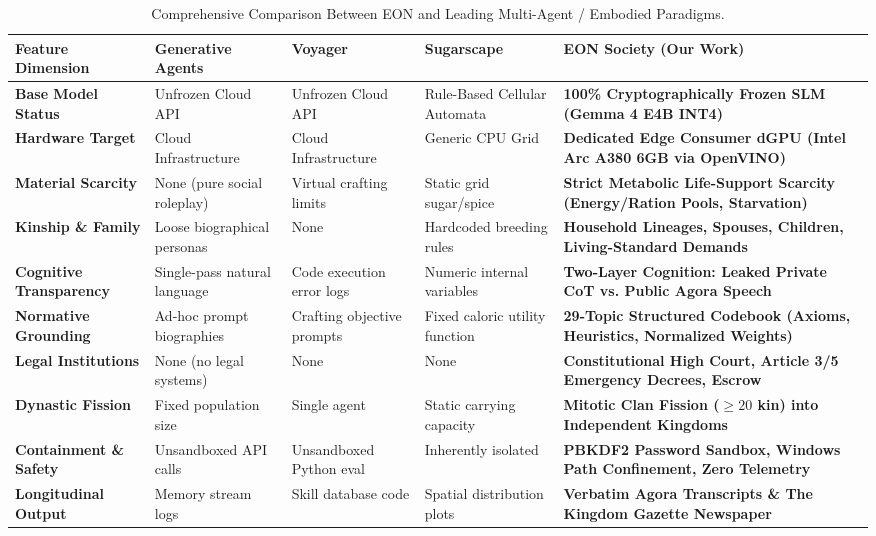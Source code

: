 \documentclass[11pt,a4paper]{article}
\begin{document}
\begin{table}[t]
\centering
\small
\caption{Comprehensive Comparison Between EON and Leading Multi-Agent / Embodied Paradigms.}
\label{tab:comparison}
\begin{tabularx}{\textwidth}{lXXXX}
\toprule
\textbf{Feature Dimension} & \textbf{Generative Agents \cite{park2023generative}} & \textbf{Voyager \cite{wang2023voyager}} & \textbf{Sugarscape \cite{epstein1996growing}} & \textbf{EON Society (Our Work)} \\
\midrule
\textbf{Base Model Status} & Unfrozen Cloud API & Unfrozen Cloud API & Rule-Based Cellular Automata & \textbf{100\% Cryptographically Frozen SLM (Gemma 4 E4B INT4)} \\
\addlinespace
\textbf{Hardware Target} & Cloud Infrastructure & Cloud Infrastructure & Generic CPU Grid & \textbf{Dedicated Edge Consumer dGPU (Intel Arc A380 6GB via OpenVINO)} \\
\addlinespace
\textbf{Material Scarcity} & None (pure social roleplay) & Virtual crafting limits & Static grid sugar/spice & \textbf{Strict Metabolic Life-Support Scarcity (Energy/Ration Pools, Starvation)} \\
\addlinespace
\textbf{Kinship \& Family} & Loose biographical personas & None & Hardcoded breeding rules & \textbf{Household Lineages, Spouses, Children, Living-Standard Demands} \\
\addlinespace
\textbf{Cognitive Transparency} & Single-pass natural language & Code execution error logs & Numeric internal variables & \textbf{Two-Layer Cognition: Leaked Private CoT vs. Public Agora Speech} \\
\addlinespace
\textbf{Normative Grounding} & Ad-hoc prompt biographies & Crafting objective prompts & Fixed caloric utility function & \textbf{29-Topic Structured Codebook (Axioms, Heuristics, Normalized Weights)} \\
\addlinespace
\textbf{Legal Institutions} & None (no legal systems) & None & None & \textbf{Constitutional High Court, Article 3/5 Emergency Decrees, Escrow} \\
\addlinespace
\textbf{Dynastic Fission} & Fixed population size & Single agent & Static carrying capacity & \textbf{Mitotic Clan Fission ($\ge 20$ kin) into Independent Kingdoms} \\
\addlinespace
\textbf{Containment \& Safety} & Unsandboxed API calls & Unsandboxed Python eval & Inherently isolated & \textbf{PBKDF2 Password Sandbox, Windows Path Confinement, Zero Telemetry} \\
\addlinespace
\textbf{Longitudinal Output} & Memory stream logs & Skill database code & Spatial distribution plots & \textbf{Verbatim Agora Transcripts \& The Kingdom Gazette Newspaper} \\
\bottomrule
\end{tabularx}
\end{table}
\end{document}
